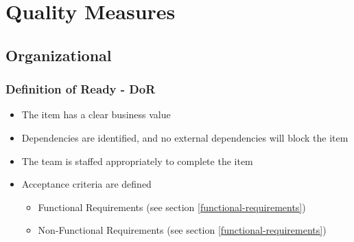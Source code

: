 \chapter{Quality Measures}

    
    

\section{Organizational}

\subsection{Definition of Ready - DoR}

\begin{itemize}
  \item The item has a clear business value
  \item Dependencies are identified, and no external dependencies will block the item
  \item The team is staffed appropriately to complete the item
  \item Acceptance criteria are defined
    \begin{itemize}
      \item Functional Requirements (see section \ref{functional-requirements})
      \item Non-Functional Requirements (see section \ref{functional-requirements})
    \end{itemize}
\end{itemize}

